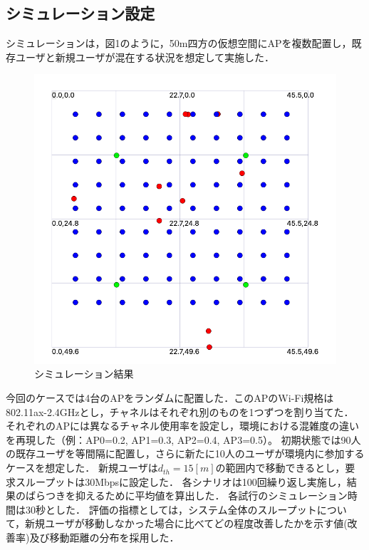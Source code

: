 \documentclass[dvipdfmx,twocolumn]{jsarticle}
\begin{document}
\subsection{シミュレーション設定}
シミュレーションは，図1のように，50m四方の仮想空間にAPを複数配置し，既存ユーザと新規ユーザが混在する状況を想定して実施した．
\begin{figure}[H]
  \centering
  \vspace{-4mm} %
  \includegraphics[width=0.8\linewidth]{simulation.png}
  \vspace{-2mm} %
  \caption{シミュレーション結果}
  \vspace{-9mm} %
\end{figure}
今回のケースでは4台のAPをランダムに配置した．このAPのWi-Fi規格は802.11ax-2.4GHzとし，チャネルはそれぞれ別のものを1つずつを割り当てた．
それぞれのAPには異なるチャネル使用率を設定し，環境における混雑度の違いを再現した（例：AP0=0.2, AP1=0.3, AP2=0.4, AP3=0.5）。
初期状態では90人の既存ユーザを等間隔に配置し，さらに新たに10人のユーザが環境内に参加するケースを想定した．
新規ユーザは$d_{th}=15[m]$の範囲内で移動できるとし，要求スループットは30Mbpsに設定した．
各シナリオは100回繰り返し実施し，結果のばらつきを抑えるために平均値を算出した．
各試行のシミュレーション時間は30秒とした．
評価の指標としては，システム全体のスループットについて，新規ユーザが移動しなかった場合に比べてどの程度改善したかを示す値(改善率)及び移動距離の分布を採用した．
\end{document}
